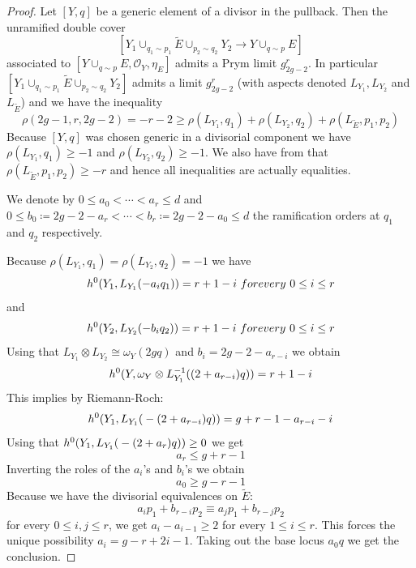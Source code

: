 \documentclass{article}
\theoremstyle{plain}
\theoremstyle{definition}
\def\OO{\mathcal{O}}
\begin{document}
\begin{proof}
	Let $[Y,q]$ be a generic element of a divisor in the pullback. Then the unramified double cover 
	\[ [Y_1\cup_{q_1\sim p_1}\widetilde{E}\cup_{p_2\sim q_2}Y_2\rightarrow Y\cup_{q\sim p}E]\]
	associated to $[Y\cup_{q\sim p}E, \OO_Y, \eta_E]$ admits a Prym limit $g^r_{2g-2}$. In particular $[Y_1\cup_{q_1\sim p_1}\widetilde{E}\cup_{p_2\sim q_2}Y_2]$ admits a limit $g^r_{2g-2}$ (with aspects denoted $L_{Y_1}, L_{Y_2}$ and $L_{\widetilde{E}}$) and we have the inequality 
	\[ \rho(2g-1,r,2g-2) = -r-2 \geq \rho(L_{Y_1}, q_1) + \rho(L_{Y_2}, q_2) + \rho(L_{\widetilde{E}}, p_1, p_2) \]
	Because $[Y,q]$ was chosen generic in a divisorial component we have $ \rho(L_{Y_1}, q_1) \geq -1$ and $ \rho(L_{Y_2}, q_2) \geq -1$. We also have from \cite[Proposition 1.4.1]{FarkasThesis} that $\rho(L_{\widetilde{E}}, p_1, p_2) \geq -r$ and hence all inequalities are actually equalities. 
	
	We denote by $0\leq a_0 <\cdots < a_r \leq d$ and $0\leq b_0 \coloneqq 2g-2-a_r <\cdots < b_r \coloneqq 2g-2-a_0 \leq d$ the ramification orders at $q_1$ and $q_2$ respectively. 
	
	Because $\rho(L_{Y_1}, q_1) = \rho(L_{Y_2}, q_2) = -1$ we have 
	\[ h^0\text{\large(}Y_1, L_{Y_1}(-a_iq_1)\text{\large)} = r+1-i \ \textrm{for every } \ 0\leq i \leq r \] 
	and 
	\[ h^0\text{\large(}Y_2, L_{Y_2}(-b_iq_2)\text{\large)} = r+1-i \ \textrm{for every } \ 0\leq i \leq r \]
	Using that $L_{Y_1}\otimes L_{Y_2} \cong \omega_Y(2gq)$ and $b_i = 2g-2-a_{r-i}$ we obtain  
	\[ h^0\text{\Large(}Y, \omega_Y\otimes L_{Y_1}^{-1}\text{\large(}(2+a_{r-i})q\text{\large)}\text{\Large)} = r+1-i \]
	This implies by Riemann-Roch: 
	\[ h^0\text{\Large(}Y_1, L_{Y_1}\text{\large(}-(2+a_{r-i})q\text{\large)}\text{\Large)} = g+r-1-a_{r-i}-i\]
	Using that $h^0\text{\Large(}Y_1, L_{Y_1}\text{\large(}-(2+a_r)q\text{\large)}\text{\Large)}\geq 0$ we get 
	\[ a_r \leq g+r-1\]
	Inverting the roles of the $a_i$'s and $b_i$'s we obtain 
	\[ a_0\geq g-r-1 \] 
	Because we have the divisorial equivalences on $\widetilde{E}$: 
	\[ a_ip_1 +b_{r-i}p_2 \equiv  a_jp_1 +b_{r-j}p_2 \]
	for every $0\leq i, j \leq r$, we get $a_i-a_{i-1} \geq 2$ for every $1\leq i \leq r$. This forces the unique possibility $a_i = g-r+2i-1$. Taking out the base locus $a_0q$ we get the conclusion. 
\end{proof}
\end{document}
